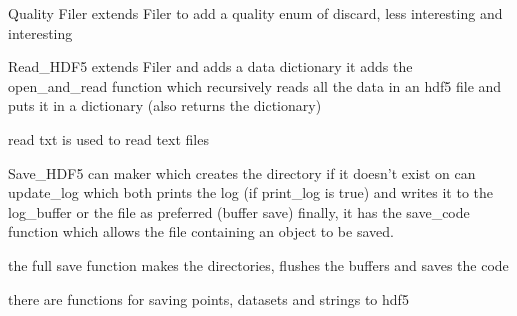 \documentclass[12pt,a4paper]{article}
\begin{document}
Quality Filer extends Filer to add a quality enum of discard, less interesting and interesting

{Read\_HDF5} extends Filer and adds a data dictionary
it adds the open\_and\_read function which recursively reads all the data in an hdf5 file and puts it in a dictionary (also returns the dictionary)

read txt is used to read text files

{Save\_HDF5} can maker which creates the directory if it doesn't exist
on can update\_log which both prints the log (if print\_log is true) and writes it to the log\_buffer or the file as preferred (buffer save)
finally, it has the save\_code function which allows the file containing an object to be saved.

the full save function makes the directories, flushes the buffers and saves the code

there are functions for saving points, datasets and strings to hdf5

%
%
\end{document}
